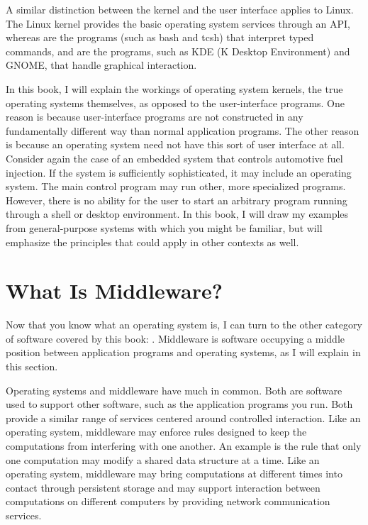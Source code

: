 A similar distinction between the kernel and the user interface
applies to Linux.  The Linux kernel provides the basic operating
system services through an API, whereas  are the
programs (such as bash and tcsh) that interpret typed commands, and
 are the programs, such as KDE (K Desktop Environment) and GNOME,
that handle graphical interaction.

In this book, I will explain the workings of operating system
kernels, the true operating systems themselves, as opposed to the
user-interface programs.  One reason is because user-interface programs
are not constructed in any fundamentally different way than normal
application programs.  The other reason is because an operating system
need not have this sort of user interface at all.  Consider again the
case of an embedded system that controls automotive fuel
injection.  If the system is sufficiently sophisticated, it may
include an operating system.  The main control program may run other,
more specialized programs.  However, there is no ability for the user
to start an arbitrary program running through a shell or desktop
environment.  In this book, I will draw my examples from
general-purpose systems with which you might be familiar, but will emphasize
the principles that could apply in other contexts as well.

\section{What Is Middleware?}\label{what-is-middleware-section}

Now that you know what an operating system is, I can turn to the other
category of software covered by this book: .  Middleware is software occupying a middle
position between application programs and operating systems, as I will
explain in this section.

Operating
systems and middleware have much in common.  Both are software used to
support other software, such as the application programs you run.
Both provide a similar range of services centered around controlled
interaction.  Like an operating system, middleware may enforce rules
designed to keep the computations from interfering with one another.
An example is the rule that only one computation may modify a shared data structure
at a time.  Like an operating system, middleware may bring
computations at different times into contact through persistent
storage and may support interaction between computations on different
computers by providing network communication services.

